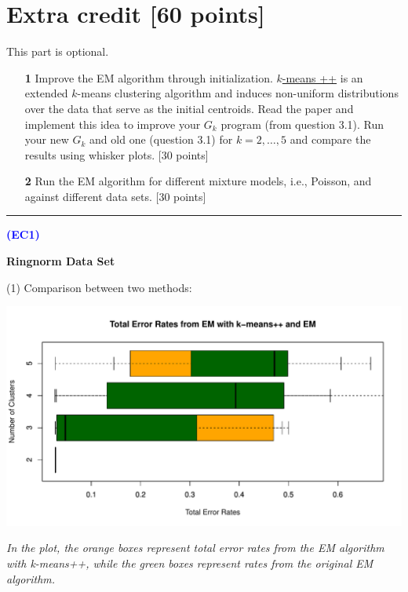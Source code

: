 \documentclass[a4paper,12pt]{article}
\newcommand{\qnum}[1]{\noindent\textcolor{blue}{\textbf{(#1)}}}
\newcommand{\sep}{\begin{center}\textcolor{gray}{\rule{\textwidth}{0.75pt}}\end{center}}
\begin{document}


\newpage
\section*{Extra credit [60 points]}

This part is optional. 

\begin{enumerate}
\item[\textbf{1}] Improve the EM algorithm  through initialization.  \href{http://ilpubs.stanford.edu:8090/778/1/2006-13.pdf}{$k$-means ++} is an extended $k$-means clustering algorithm and induces non-uniform  distributions over  the data  that serve as  the initial centroids. Read the paper and implement this idea to improve your $G_k$ program (from question 3.1). Run your new $G_k$ and old one (question 3.1) for $k= 2,\dots,5$ and compare the results using whisker plots. [30 points]
\\

\item[\textbf{2}]  Run the EM algorithm for different mixture models, i.e., Poisson,  and against different data sets. [30 points]
\end{enumerate}
\sep 

\qnum{EC1}
\begin{center}
    \textcolor{mydarkgreen}{\textbf{Ringnorm Data Set}}
\end{center}
\bigskip

\noindent (1) Comparison between two methods:

\begin{center}
  \includegraphics[width=0.9\linewidth]{Image/ProbEC1-TotalErr-Ringnorm-Both.pdf}
  
   \parbox{0.9\textwidth}{\textit{In the plot, the \textcolor{myorange}{orange boxes} represent total error rates from the EM algorithm with k-means++, while the \textcolor{mydarkgreen}{green boxes} represent rates from the original EM algorithm.
  }}
\end{center}
\bigskip
\end{document}
